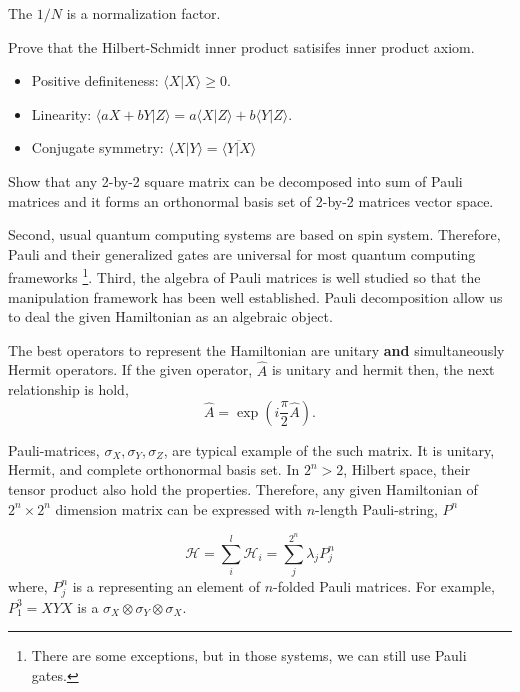 The $1/N$ is a normalization factor. 

\begin{exercise}
    Prove that the Hilbert-Schmidt inner product satisifes inner product axiom.

    \begin{itemize}
        \item Positive definiteness: $\langle X | X \rangle \geq 0$.
        \item Linearity: $\langle a X+ bY | Z \rangle = a \langle X | Z \rangle + b \langle Y | Z \rangle$.
        \item Conjugate symmetry: $\langle X | Y \rangle = \overline{\langle Y | X \rangle}$
    \end{itemize}
\end{exercise}

\begin{exercise}
    Show that any 2-by-2 square matrix can be decomposed into sum of Pauli matrices 
    and it forms an orthonormal basis set of 2-by-2 matrices vector space.
\end{exercise}

Second, usual quantum computing systems are based on spin system.
Therefore, Pauli and their generalized gates are universal for most quantum computing frameworks
\footnote{There are some exceptions, but in those systems, we can still use Pauli gates.}.
Third, the algebra of Pauli matrices is well studied so that the manipulation framework has been well established.
Pauli decomposition allow us to deal the given Hamiltonian as an algebraic object.

The best operators to represent the Hamiltonian are unitary \textbf{and} simultaneously Hermit operators. 
If the given operator, $\hat{A}$ is unitary and hermit then, the next relationship is hold,
\begin{equation}
    \hat{A} = \exp(i \frac{\pi}{2}\hat{A}).
\end{equation}

Pauli-matrices, $\sigma_{X}, \sigma_{Y}, \sigma_{Z}$, are typical example of the such matrix.
It is unitary, Hermit, and complete orthonormal basis set. 
In $2^n>2$, Hilbert space, their tensor product also hold the properties.
Therefore, any given Hamiltonian of $2^n \times 2^n$ dimension matrix can be expressed with $n$-length Pauli-string, 
$P^n$

\begin{equation}
    \label{eq:Pauli-decompositon}
    \mathcal{H} = \sum_i^l \mathcal{H}_i = \sum_j^{2^n} \lambda_j P_j^n
\end{equation}
where, $P_j^n$ is a representing an element of $n$-folded Pauli matrices.
For example, $P_1^3 = XYX$ is a $\sigma_X \otimes \sigma_Y \otimes \sigma_X$. 

